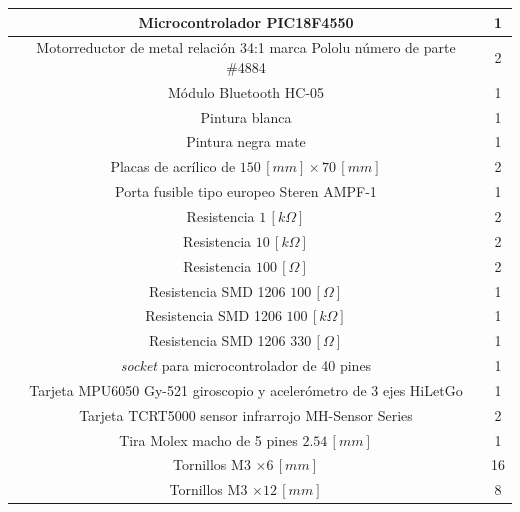 \documentclass{article}
\begin{document}
\begin{table}[H]
\begin{tabular}{|c|c|}
Microcontrolador PIC18F4550 & 1\\ \hline
Motorreductor de metal relación 34:1 marca Pololu número de parte \#4884 & 2\\ \hline
Módulo Bluetooth HC-05 & 1\\ \hline
Pintura blanca & 1\\ \hline
Pintura negra mate & 1\\ \hline
Placas de acrílico de $150\,[mm]\times70\,[mm]$ & 2\\ \hline
Porta fusible tipo europeo Steren AMPF-1 & 1\\ \hline
Resistencia $1\,[k\Omega]$ & 2\\ \hline
Resistencia $10\,[k\Omega]$ & 2\\ \hline
Resistencia $100\,[\Omega]$ & 2\\ \hline
Resistencia SMD 1206 $100\,[\Omega]$ & 1\\ \hline
Resistencia SMD 1206 $100\,[k\Omega]$ & 1\\ \hline
Resistencia SMD 1206 $330\,[\Omega]$ & 1\\ \hline
\textit{socket} para microcontrolador de 40 pines & 1\\ \hline
Tarjeta MPU6050 Gy-521 giroscopio y acelerómetro de 3 ejes HiLetGo & 1\\ \hline
Tarjeta TCRT5000 sensor infrarrojo MH-Sensor Series & 2\\ \hline
Tira Molex macho de 5 pines $2.54\,[mm]$ & 1\\ \hline
Tornillos M3 $\times6\,[mm]$ & 16\\ \hline
Tornillos M3 $\times12\,[mm]$ & 8\\
\hline
\end{tabular}
\label{tabla:materiales}
\end{table}
\end{document}
